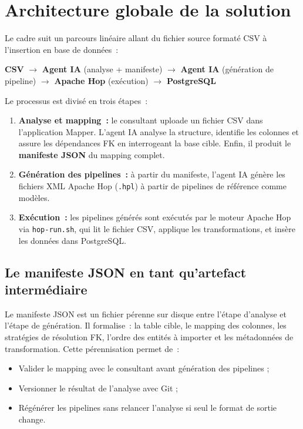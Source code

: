 \clearpage
\section{Architecture globale de la solution}
\label{sec:archi-globale}

Le cadre suit un parcours linéaire allant du fichier source formaté CSV à l'insertion en base de données~:

\begin{center}
\textbf{CSV} $\longrightarrow$ \textbf{Agent IA} (analyse + manifeste) $\longrightarrow$ \textbf{Agent IA} (génération de pipeline) $\longrightarrow$ \textbf{Apache Hop} (exécution) $\longrightarrow$ \textbf{PostgreSQL}
\end{center}

Le processus est divisé en trois étapes~:

\begin{enumerate}
    \item \textbf{Analyse et mapping~:} le consultant uploade un fichier CSV dans l'application Mapper. L'agent IA analyse la structure, identifie les colonnes et assure les dépendances FK en interrogeant la base cible. Enfin, il produit le \textbf{manifeste JSON} du mapping complet.
    \item \textbf{Génération des pipelines~:} à partir du manifeste, l'agent IA génère les fichiers XML Apache Hop (\texttt{.hpl}) à partir de pipelines de référence comme modèles.
    \item \textbf{Exécution~:} les pipelines générés sont exécutés par le moteur Apache Hop via \texttt{hop-run.sh}, qui lit le fichier CSV, applique les transformations, et insère les données dans PostgreSQL.
\end{enumerate}

\subsection{Le manifeste JSON en tant qu'artefact intermédiaire}

Le manifeste JSON est un fichier pérenne sur disque entre l'étape d'analyse et l'étape de génération. Il formalise~: la table cible, le mapping des colonnes, les stratégies de résolution FK, l'ordre des entités à importer et les métadonnées de transformation. Cette pérennisation permet de~:
\begin{itemize}
    \item Valider le mapping avec le consultant avant génération des pipelines ;
    \item Versionner le résultat de l'analyse avec Git ;
    \item Régénérer les pipelines sans relancer l'analyse si seul le format de sortie change.
\end{itemize}

